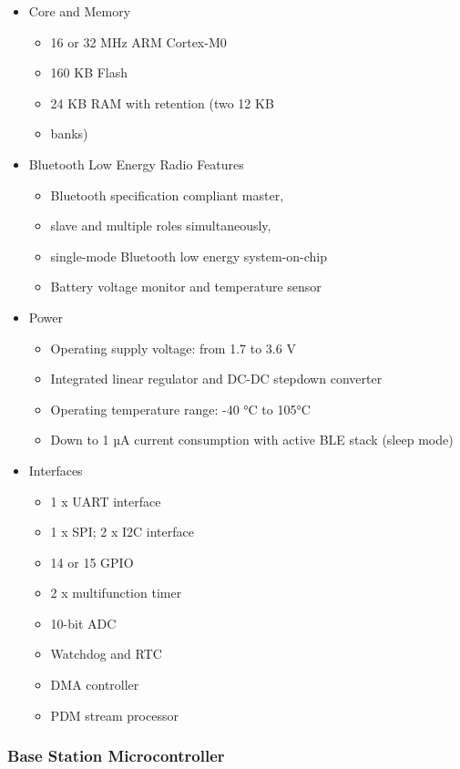 \documentclass[journal,compsoc]{IEEEtran}
\begin{document}
\begin{itemize}
  \item Core and Memory
    \begin{itemize}
      \item 16 or 32 MHz ARM Cortex-M0
      \item 160 KB Flash
      \item 24 KB RAM with retention (two 12 KB
        \item banks)
    \end{itemize}
  \item Bluetooth Low Energy Radio Features
    \begin{itemize}
      \item Bluetooth specification compliant master,
      \item slave and multiple roles simultaneously,
      \item single-mode Bluetooth low energy system-on-chip
      \item Battery voltage monitor and temperature sensor
    \end{itemize}
  \item Power
    \begin{itemize}
      \item Operating supply voltage: from 1.7 to 3.6 V
      \item Integrated linear regulator and DC-DC stepdown converter
      \item Operating temperature range: -40 °C to 105°C
      \item Down to 1 µA current consumption with active BLE stack (sleep mode)
    \end{itemize}
  \item Interfaces
    \begin{itemize}
      \item 1 x UART interface
      \item 1 x SPI; 2 x I2C interface
      \item 14 or 15 GPIO
      \item 2 x multifunction timer
      \item 10-bit ADC
      \item Watchdog and RTC
      \item DMA controller
      \item PDM stream processor
    \end{itemize}
\end{itemize}

\subsubsection{Base Station Microcontroller}
\end{document}
